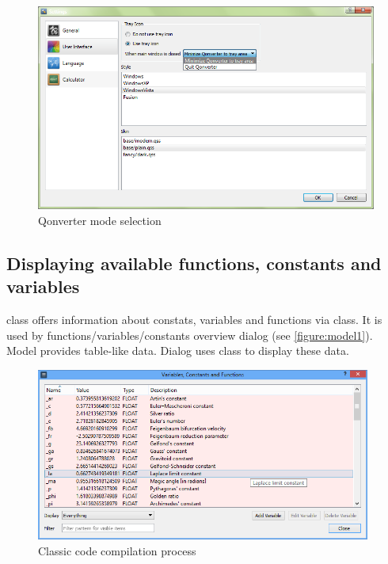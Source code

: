 \begin{figure}[ht]
\begin{center}
\includegraphics[width=13cm]{graphics/real-world/02-settings-gui.png}
\caption{Qonverter mode selection}\label{figure:settingsgui}
\end{center}
\end{figure}

\subsection{Displaying available functions, constants and variables}\label{chap:guii}
 class offers information about constats, variables and functions via class. It is used by functions/variables/constants overview dialog (see \autoref{figure:model1}). Model provides table-like data. Dialog uses class to display these data.

\begin{figure}[ht]
\centering
\includegraphics[width=11cm]{graphics/real-world/07-model1.png}
\caption{Classic \cpp{} code compilation process}\label{figure:model1}
\end{figure}

